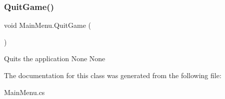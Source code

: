 \subsubsection{\texorpdfstring{Quit\+Game()}{QuitGame()}}
{\footnotesize\ttfamily void Main\+Menu.\+Quit\+Game (\begin{DoxyParamCaption}{ }\end{DoxyParamCaption})\hspace{0.3cm}{\ttfamily [inline]}}

Quits the application  None  None 

The documentation for this class was generated from the following file\+:\begin{DoxyCompactItemize}
\item 
Main\+Menu.\+cs\end{DoxyCompactItemize}
